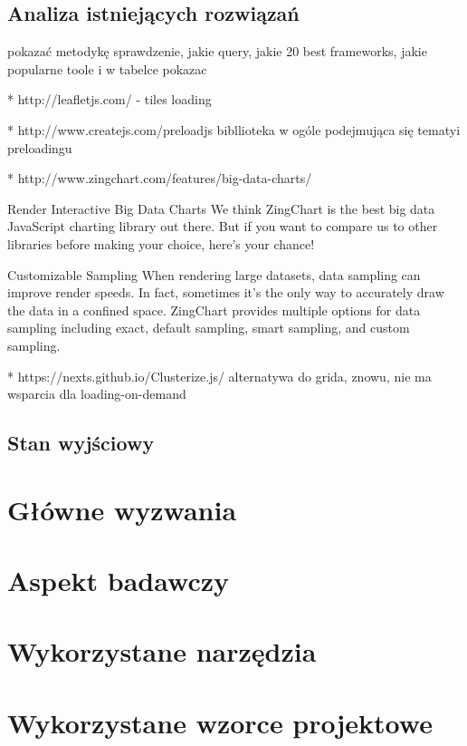 \subsection{Analiza istniejących rozwiązań}

pokazać metodykę sprawdzenie, jakie query, jakie 20 best frameworks, jakie popularne toole i w tabelce pokazac

* http://leafletjs.com/ - tiles loading

* http://www.createjs.com/preloadjs
bibllioteka w ogóle podejmująca się tematyi preloadingu

* http://www.zingchart.com/features/big-data-charts/

 Render Interactive Big Data Charts
 We think ZingChart is the best big data JavaScript charting library out there. But if you want to compare us to other libraries before making your choice, here’s your chance!

Customizable Sampling
When rendering large datasets, data sampling can improve render speeds. In fact, sometimes it's the only way to accurately draw the data in a confined space. ZingChart provides multiple options for data sampling including exact, default sampling, smart sampling, and custom sampling.

* https://nexts.github.io/Clusterize.js/
alternatywa do grida, znowu, nie ma wsparcia dla loading-on-demand
\subsection{Stan wyjściowy}

\section{Główne wyzwania}
\section{Aspekt badawczy}
\section{Wykorzystane narzędzia}
\section{Wykorzystane wzorce projektowe}
